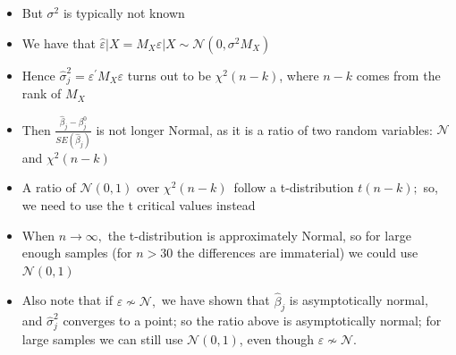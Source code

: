 \documentclass[notes=show]{beamer}
\begin{document}
\begin{frame}%


\begin{itemize}
\item But $\sigma ^{2}$ is typically not known

\item We have that $\hat{\varepsilon}|X=M_{X}\varepsilon |X\sim \mathcal{N}%
\left( 0,\sigma ^{2}M_{X}\right) $

\item Hence $\widehat{\sigma }_{j}^{2}=\varepsilon ^{\prime
}M_{X}\varepsilon $ turns out to be $\chi ^{2}(n-k)$, where $n-k$ comes from
the rank of $M_{X}$

\item Then $\frac{\widehat{\beta }_{j}-\beta _{j}^{0}}{SE(\widehat{\beta }%
_{j})}$ is not longer Normal, as it is a ratio of two random variables: $%
\mathcal{N}$ and $\chi ^{2}(n-k)$

\item A ratio of $\mathcal{N}(0,1)$ over $\chi ^{2}(n-k)$\ follow a
t-distribution $t(n-k);$ so, we need to use the t critical values instead

\item When $n\rightarrow \infty ,$ the t-distribution is approximately
Normal, so for large enough samples (for $n>30$ the differences are
immaterial) we could use $\mathcal{N}(0,1)$

\item Also note that if $\varepsilon \nsim \mathcal{N},$ we have shown that $%
\widehat{\beta }_{j}$ is asymptotically normal, and $\widehat{\sigma }%
_{j}^{2}$ converges to a point; so the ratio above is asymptotically normal;
for large samples we can still use $\mathcal{N}(0,1)$, even though $%
\varepsilon \nsim \mathcal{N}.$
\end{itemize}

\end{frame}%
\end{document}
